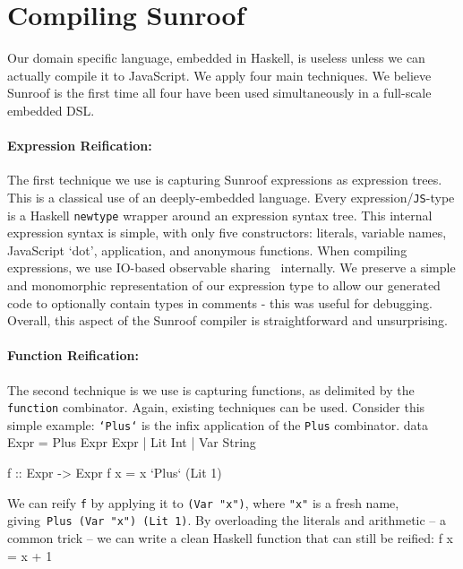 \documentclass{llncs}
\newcommand{\Src}[1]{{\tt{#1}}}
\newenvironment{Code}{\verbatim}{\endverbatim}
\begin{document}

\section{Compiling Sunroof}
\label{sec:compiler}

Our domain specific language, embedded in Haskell, is useless unless
we can actually compile it to JavaScript. We apply four main techniques.
We believe Sunroof is the first time all four have been used simultaneously
in a full-scale embedded DSL.

\paragraph{Expression Reification:}
The first technique we use is capturing Sunroof expressions as expression trees. 
This is a classical use of an deeply-embedded language. Every expression/\Src{JS}-type
is a Haskell \Src{newtype} wrapper around an expression syntax tree.
This internal expression syntax is simple, with only five constructors:
literals, variable names, JavaScript `dot', application, and anonymous functions.
When compiling expressions, we use IO-based observable sharing~\cite{...} internally.
We preserve a simple and monomorphic representation of our expression
type to allow our generated code to optionally contain types in comments -
this was useful for debugging.
Overall, this aspect of the Sunroof compiler is straightforward and unsurprising.

\paragraph{Function Reification:}
The second technique is we use is capturing functions, as delimited
by the \Src{function} combinator. Again, existing techniques can be used.
Consider this simple example: \Src{`Plus`} is the infix application of
the \Src{Plus} combinator.
\begin{Code}
data Expr = Plus Expr Expr | Lit Int | Var String

f :: Expr -> Expr
f x = x `Plus` (Lit 1)
\end{Code}

We can reify \Src{f} by applying it to \Src{(Var "x")}, where \Src{"x"} is a fresh name,
giving~\Src{Plus (Var "x") (Lit 1)}. By overloading the literals and arithmetic -- 
a common trick -- we can write a clean Haskell function that can still be reified:
\begin{Code}
f  x = x + 1
\end{Code}
\end{document}
